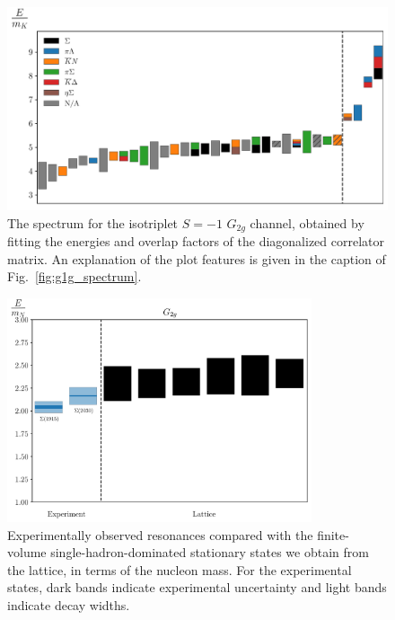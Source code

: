 \begin{figure}[H]
    \centering
    \hspace*{-0.5in}\includegraphics[width=\textwidth]{figures/sigmas/g2g/staircase_mk.pdf}
    \caption[The spectrum for the isotriplet $S=-1$ $G_{2g}$ channel, obtained by fitting the energies and overlap factors of the diagonalized correlator matrix.]{The spectrum for the isotriplet $S=-1$ $G_{2g}$ channel, obtained by fitting the energies and overlap factors of the diagonalized correlator matrix. An explanation of the plot features is given in the caption of Fig.~\ref{fig:g1g_spectrum}.}\label{fig:g2g_spectrum}
\end{figure}

\begin{figure}[H]
    \centering
    \includegraphics[width=0.8\textwidth]{figures/sigmas/g2g/expvslat.pdf}
    \caption[Experimentally observed resonances compared with the finite-volume single-hadron-dominated stationary states we obtain from the lattice in $G_{2g}$, in terms of the nucleon mass.]{Experimentally observed resonances compared with the finite-volume single-hadron-dominated stationary states we obtain from the lattice, in terms of the nucleon mass. For the experimental states, dark bands indicate experimental uncertainty and light bands indicate decay widths.}\label{fig:g2g_exp}
\end{figure}

